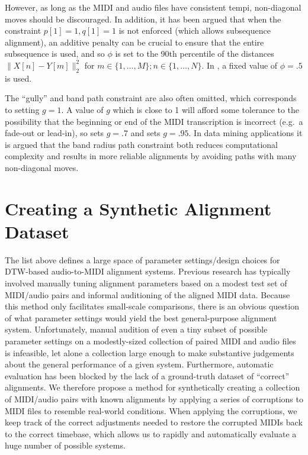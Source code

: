 \documentclass{article}
\begin{document}
\begin{description}[topsep=1pt,itemsep=-1pt,leftmargin=5pt]
However, as long as the MIDI and audio files have consistent tempi, non-diagonal moves should be discouraged.
In addition, it has been argued \cite{raffel2015large} that when the constraint $p[1] = 1, q[1] = 1$ is not enforced (which allows subsequence alignment), an additive penalty can be crucial to ensure that the entire subsequence is used, and so $\phi$ is set to the 90th percentile of the distances $\|X[n] - Y[m]\|_2^2$ for $m \in \{1, \ldots, M\}; n \in \{1, \ldots, N\}$.
In \cite{ellis2013aligning}, a fixed value of $\phi = .5$ is used.
\item[Gully ($g$) and band path constraint:] The ``gully'' and band path constraint are also often omitted, which corresponds to setting $g = 1$.
A value of $g$ which is close to 1 will afford some tolerance to the possibility that the beginning or end of the MIDI transcription is incorrect (e.g.\ a fade-out or lead-in), so \cite{ellis2013aligning} sets $g = .7$ and \cite{raffel2015large} sets $g = .95$.
In data mining applications \cite{ratanamahatana2004everything} it is argued that the band radius path constraint both reduces computational complexity and results in more reliable alignments by avoiding paths with many non-diagonal moves.
\end{description}

\section{Creating a Synthetic Alignment Dataset}
\label{sec:synthetic}

The list above defines a large space of parameter settings/design choices for DTW-based audio-to-MIDI alignment systems.
Previous research has typically involved manually tuning alignment parameters based on a modest test set of MIDI/audio pairs and informal auditioning of the aligned MIDI data.
Because this method only facilitates small-scale comparisons, there is an obvious question of what parameter settings would yield the best general-purpose alignment system.
Unfortunately, manual audition of even a tiny subset of possible parameter settings on a modestly-sized collection of paired MIDI and audio files is infeasible, let alone a collection large enough to make substantive judgements about the general performance of a given system.
Furthermore, automatic evaluation has been blocked by the lack of a ground-truth dataset of ``correct'' alignments.
We therefore propose a method for synthetically creating a collection of MIDI/audio pairs with known alignments by applying a series of corruptions to MIDI files to resemble real-world conditions.
When applying the corruptions, we keep track of the correct adjustments needed to restore the corrupted MIDIs back to the correct timebase, which allows us to rapidly and automatically evaluate a huge number of possible systems.
\end{document}
